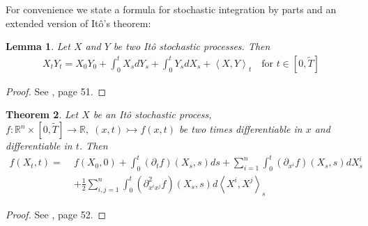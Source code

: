 \documentclass[12pt]{article}
\newtheorem{theorem}{Theorem}[section]
\newtheorem{lemma}[theorem]{Lemma}
\begin{document}
	For convenience we state a formula for stochastic integration by parts and an extended version of Itô's theorem:
	\begin{lemma}
		Let $X$ and $Y$ be two Itô stochastic processes. Then
		\begin{align*}
			X_t Y_t = X_0 Y_0 + \int_{0}^{t}X_sdY_s + \int_{0}^{t}Y_sdX_s + \left\langle X, Y\right\rangle_t \quad \text{for }t \in \left[0,\tilde{T}\right]
		\end{align*}
	\end{lemma}
	\begin{proof}
		See \cite{fima2Lecture}, page 51. %
	\end{proof}
	\begin{theorem}
		Let $X$ be an Itô stochastic process, $f: \mathbb{R}^n \times [0,\tilde{T}] \rightarrow \mathbb{R}, \; (x,t) \rightarrowtail f(x, t)$ be two times differentiable in $x$ and differentiable in $t$. Then
		\begin{align*}
			f(X_t, t) = \;&f(X_0, 0) + \int_{0}^{t}(\partial_{t}f)(X_s, s)ds + \sum_{i=1}^{n}\int_{0}^{t}(\partial_{x^i}f)(X_s, s)dX^i_s \\
			&+ \frac{1}{2} \sum_{i,j=1}^{n}\int_{0}^{t}(\partial^2_{x^ix^j}f)(X_s, s)d\left\langle X^i, X^j\right\rangle_s
		\end{align*}
		
	\end{theorem}
	\begin{proof}
		See \cite{fima2Lecture}, page 52. %
	\end{proof}
	
\end{document}
